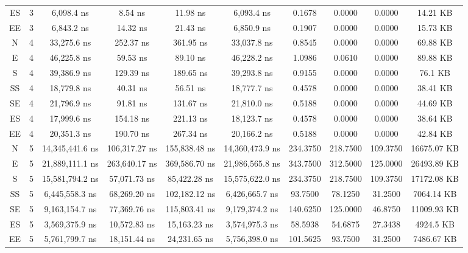 \begin{sidewaystable}
\begin{tabular}{|c|c|c|c|c|c|c|c|c|c|}
        ES     & 3     & 6,098.4 ns      & 8.54 ns       & 11.98 ns      & 6,093.4 ns      & 0.1678   & 0.0000   & 0.0000   & 14.21 KB    \\
        EE     & 3     & 6,843.2 ns      & 14.32 ns      & 21.43 ns      & 6,850.9 ns      & 0.1907   & 0.0000   & 0.0000   & 15.73 KB    \\
        N      & 4     & 33,275.6 ns     & 252.37 ns     & 361.95 ns     & 33,037.8 ns     & 0.8545   & 0.0000   & 0.0000   & 69.88 KB    \\
        E      & 4     & 46,225.8 ns     & 59.53 ns      & 89.10 ns      & 46,228.2 ns     & 1.0986   & 0.0610   & 0.0000   & 89.88 KB    \\
        S      & 4     & 39,386.9 ns     & 129.39 ns     & 189.65 ns     & 39,293.8 ns     & 0.9155   & 0.0000   & 0.0000   & 76.1 KB     \\
        SS     & 4     & 18,779.8 ns     & 40.31 ns      & 56.51 ns      & 18,777.7 ns     & 0.4578   & 0.0000   & 0.0000   & 38.41 KB    \\
        SE     & 4     & 21,796.9 ns     & 91.81 ns      & 131.67 ns     & 21,810.0 ns     & 0.5188   & 0.0000   & 0.0000   & 44.69 KB    \\
        ES     & 4     & 17,999.6 ns     & 154.18 ns     & 221.13 ns     & 18,123.7 ns     & 0.4578   & 0.0000   & 0.0000   & 38.64 KB    \\
        EE     & 4     & 20,351.3 ns     & 190.70 ns     & 267.34 ns     & 20,166.2 ns     & 0.5188   & 0.0000   & 0.0000   & 42.84 KB    \\
        N      & 5     & 14,345,441.6 ns & 106,317.27 ns & 155,838.48 ns & 14,360,473.9 ns & 234.3750 & 218.7500 & 109.3750 & 16675.07 KB \\
        E      & 5     & 21,889,111.1 ns & 263,640.17 ns & 369,586.70 ns & 21,986,565.8 ns & 343.7500 & 312.5000 & 125.0000 & 26493.89 KB \\
        S      & 5     & 15,581,794.2 ns & 57,071.73 ns  & 85,422.28 ns  & 15,575,622.0 ns & 234.3750 & 218.7500 & 109.3750 & 17172.08 KB \\
        SS     & 5     & 6,445,558.3 ns  & 68,269.20 ns  & 102,182.12 ns & 6,426,665.7 ns  & 93.7500  & 78.1250  & 31.2500  & 7064.14 KB  \\
        SE     & 5     & 9,163,154.7 ns  & 77,369.76 ns  & 115,803.41 ns & 9,179,374.2 ns  & 140.6250 & 125.0000 & 46.8750  & 11009.93 KB \\
        ES     & 5     & 3,569,375.9 ns  & 10,572.83 ns  & 15,163.23 ns  & 3,574,975.3 ns  & 58.5938  & 54.6875  & 27.3438  & 4924.5 KB   \\
        EE     & 5     & 5,761,799.7 ns  & 18,151.44 ns  & 24,231.65 ns  & 5,756,398.0 ns  & 101.5625 & 93.7500  & 31.2500  & 7486.67 KB  \\
        \hline
    \end{tabular}
\end{sidewaystable}
